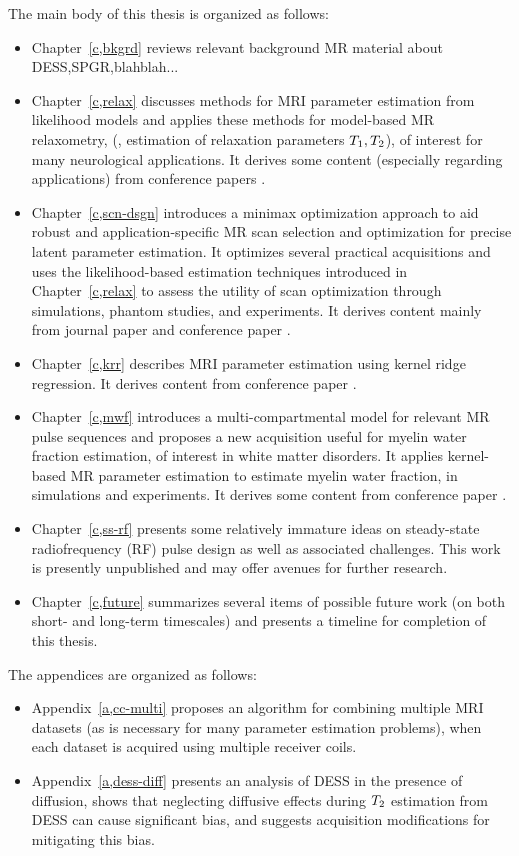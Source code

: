 The main body of this thesis is organized as follows:
\begin{itemize}
\item 
	Chapter~\ref{c,bkgrd} reviews 
	relevant background MR material
	about DESS,SPGR,blahblah...
\item 
	Chapter~\ref{c,relax} discusses methods 
	for MRI parameter estimation 
	from likelihood models 
	and applies these methods 
	for model-based MR relaxometry, 
	(\ie, estimation of relaxation parameters $T_1,T_2$),
	of interest for many neurological applications.
	It derives some content 
	(especially regarding applications)
	from conference papers 
	\cite{nataraj:14:rje,nataraj:14:mbe}.
\item
	Chapter~\ref{c,scn-dsgn} introduces
	a minimax optimization approach
	to aid robust and application-specific 
	MR scan selection and optimization 
	for precise latent parameter estimation.
	It optimizes several practical acquisitions 
	and uses the likelihood-based estimation techniques 
	introduced in Chapter~\ref{c,relax}
	to assess the utility
	of scan optimization
	through simulations, 
	phantom studies, 
	and \invivo experiments.
	It derives content
	mainly from journal paper
	\cite{nataraj::oms}
	and conference paper
	\cite{nataraj:15:amm}.
\item 
	Chapter~\ref{c,krr} describes 
	MRI parameter estimation
	using kernel ridge regression.
	It derives content 
	from conference paper
	\cite{nataraj:17:dfm}.
\item
	Chapter~\ref{c,mwf} introduces a multi-compartmental model
	for relevant MR pulse sequences
	and proposes a new acquisition 
	useful for myelin water fraction estimation,
	of interest in white matter disorders.
	It applies kernel-based MR parameter estimation
	to estimate myelin water fraction,
	in simulations and \invivo experiments.
	It derives some content from conference paper
	\cite{nataraj:17:mwf}.
\item
	Chapter~\ref{c,ss-rf} presents
	some relatively immature ideas
	on steady-state radiofrequency (RF) pulse design
	as well as associated challenges.
	This work is presently unpublished
	and may offer avenues for further research.
\item 
	Chapter~\ref{c,future} summarizes several items 
	of possible future work
	(on both short- and long-term timescales) 
	and presents a timeline
	for completion of this thesis.
\end{itemize}

The appendices are organized as follows:
\begin{itemize}
\item
	Appendix~\ref{a,cc-multi} proposes an algorithm
	for combining multiple MRI datasets
	(as is necessary for many parameter estimation problems),
	when each dataset is acquired 
	using multiple receiver coils.
\item
	Appendix~\ref{a,dess-diff} presents an analysis
	of DESS in the presence of diffusion,
	shows that neglecting diffusive effects
	during $T_2$ estimation from DESS
	can cause significant bias,
	and suggests acquisition modifications
	for mitigating this bias.
\end{itemize}

